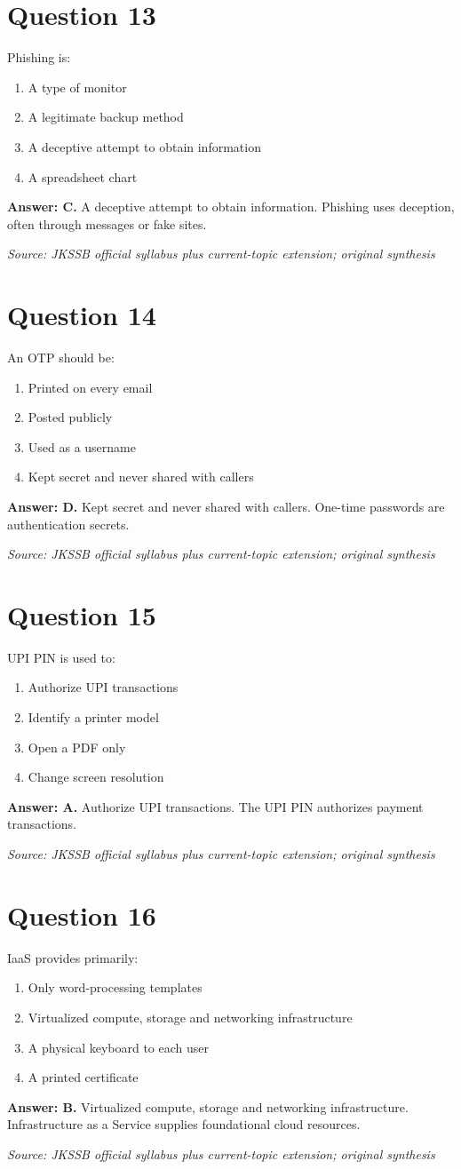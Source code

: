 \documentclass[11pt,a4paper]{book}
\newcommand{\source}[1]{\par\smallskip\textit{Source: #1}}
\newcommand{\answer}[2]{\par\textbf{Answer: #1.} #2}
\begin{document}
\section*{Question 13}
Phishing is:
\begin{enumerate}[label=\Alph*.]
\item A type of monitor
\item A legitimate backup method
\item A deceptive attempt to obtain information
\item A spreadsheet chart
\end{enumerate}
\answer{C}{A deceptive attempt to obtain information. Phishing uses deception, often through messages or fake sites.}
\source{JKSSB official syllabus plus current-topic extension; original synthesis}
\section*{Question 14}
An OTP should be:
\begin{enumerate}[label=\Alph*.]
\item Printed on every email
\item Posted publicly
\item Used as a username
\item Kept secret and never shared with callers
\end{enumerate}
\answer{D}{Kept secret and never shared with callers. One-time passwords are authentication secrets.}
\source{JKSSB official syllabus plus current-topic extension; original synthesis}
\section*{Question 15}
UPI PIN is used to:
\begin{enumerate}[label=\Alph*.]
\item Authorize UPI transactions
\item Identify a printer model
\item Open a PDF only
\item Change screen resolution
\end{enumerate}
\answer{A}{Authorize UPI transactions. The UPI PIN authorizes payment transactions.}
\source{JKSSB official syllabus plus current-topic extension; original synthesis}
\section*{Question 16}
IaaS provides primarily:
\begin{enumerate}[label=\Alph*.]
\item Only word-processing templates
\item Virtualized compute, storage and networking infrastructure
\item A physical keyboard to each user
\item A printed certificate
\end{enumerate}
\answer{B}{Virtualized compute, storage and networking infrastructure. Infrastructure as a Service supplies foundational cloud resources.}
\source{JKSSB official syllabus plus current-topic extension; original synthesis}
\end{document}
